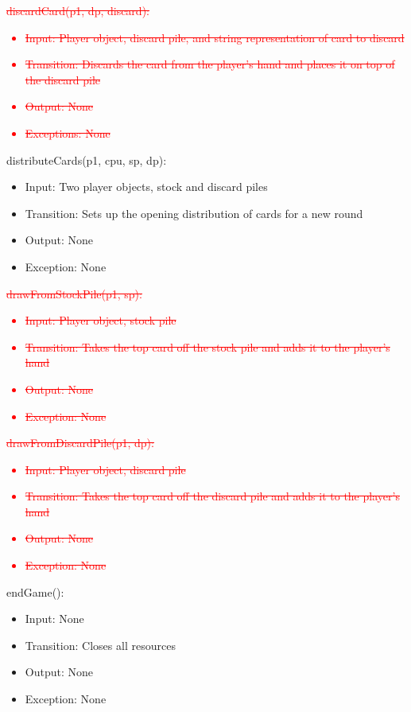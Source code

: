 \documentclass[12pt, titlepage]{article}
\begin{document}
\noindent \textcolor{red}{\sout{discardCard(p1, dp, discard):}
\begin{itemize}
    \item \sout{Input: Player object, discard pile, and string representation of card to discard}
    \item \sout{Transition: Discards the card from the player's hand and places it on top of the discard pile}
    \item \sout{Output: None}
    \item \sout{Exceptions: None}
\end{itemize}
}
\noindent distributeCards(p1, cpu, sp, dp):
\begin{itemize}
    \item Input: Two player objects, stock and discard piles
    \item Transition: Sets up the opening distribution of cards for a new round
    \item Output: None
    \item Exception: None
\end{itemize}

\noindent \textcolor{red}{\sout{drawFromStockPile(p1, sp):}
\begin{itemize}
    \item \sout{Input: Player object, stock pile}
    \item \sout{Transition: Takes the top card off the stock pile and adds it to the player's hand}
    \item \sout{Output: None}
    \item \sout{Exception: None}
\end{itemize}
}

\noindent \textcolor{red}{\sout{drawFromDiscardPile(p1, dp):}
\begin{itemize}
    \item \sout{Input: Player object, discard pile}
    \item \sout{Transition: Takes the top card off the discard pile and adds it to the player's hand}
    \item \sout{Output: None}
    \item \sout{Exception: None}
\end{itemize}
}

\noindent endGame():
\begin{itemize}
    \item Input: None
    \item Transition: Closes all resources
    \item Output: None
    \item Exception: None
\end{itemize}
\end{document}
